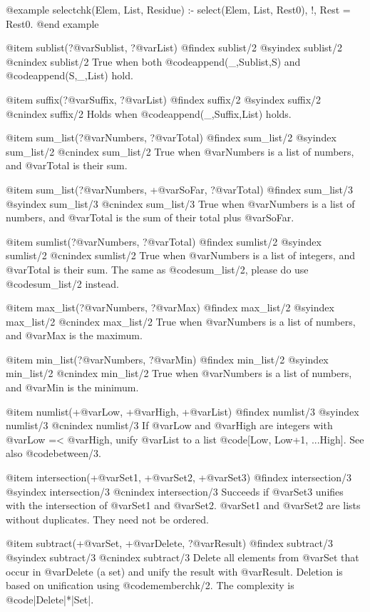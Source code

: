 {{{{{{{{@example
selectchk(Elem, List, Residue) :-
        select(Elem, List, Rest0), !,
        Rest = Rest0.
@end example

 
@item sublist(?@var{Sublist}, ?@var{List})
@findex sublist/2
@syindex sublist/2
@cnindex sublist/2
True when both @code{append(_,Sublist,S)} and @code{append(S,_,List)} hold.
 
@item suffix(?@var{Suffix}, ?@var{List})
@findex suffix/2
@syindex suffix/2
@cnindex suffix/2
Holds when @code{append(_,Suffix,List)} holds.

@item sum_list(?@var{Numbers}, ?@var{Total})
@findex sum_list/2
@syindex sum_list/2
@cnindex sum_list/2
True when @var{Numbers} is a list of numbers, and @var{Total} is their sum.

@item sum_list(?@var{Numbers}, +@var{SoFar}, ?@var{Total})
@findex sum_list/3
@syindex sum_list/3
@cnindex sum_list/3
True when @var{Numbers} is a list of numbers, and @var{Total} is the sum of their total plus @var{SoFar}.

@item sumlist(?@var{Numbers}, ?@var{Total})
@findex sumlist/2
@syindex sumlist/2
@cnindex sumlist/2
True when @var{Numbers} is a list of integers, and @var{Total} is their
sum. The same as @code{sum_list/2}, please do use @code{sum_list/2}
instead.

@item max_list(?@var{Numbers}, ?@var{Max})
@findex max_list/2
@syindex max_list/2
@cnindex max_list/2
True when @var{Numbers} is a list of numbers, and @var{Max} is the maximum.

@item min_list(?@var{Numbers}, ?@var{Min})
@findex min_list/2
@syindex min_list/2
@cnindex min_list/2
True when @var{Numbers} is a list of numbers, and @var{Min} is the minimum.

@item numlist(+@var{Low}, +@var{High}, +@var{List})
@findex numlist/3
@syindex numlist/3
@cnindex numlist/3
If @var{Low} and @var{High} are integers with @var{Low} =<
@var{High}, unify @var{List} to a list @code{[Low, Low+1, ...High]}. See
also @code{between/3}.

@item intersection(+@var{Set1}, +@var{Set2}, +@var{Set3})
@findex intersection/3
@syindex intersection/3
@cnindex intersection/3
Succeeds if @var{Set3} unifies with the intersection of @var{Set1} and
@var{Set2}. @var{Set1} and @var{Set2} are lists without duplicates. They
need not be ordered.

@item subtract(+@var{Set}, +@var{Delete}, ?@var{Result})
@findex subtract/3
@syindex subtract/3
@cnindex subtract/3
Delete all elements from @var{Set} that   occur  in @var{Delete} (a set)
and unify the  result  with  @var{Result}.   Deletion  is  based  on
unification using @code{memberchk/2}. The complexity is
@code{|Delete|*|Set|}.

}}}}}}}}
